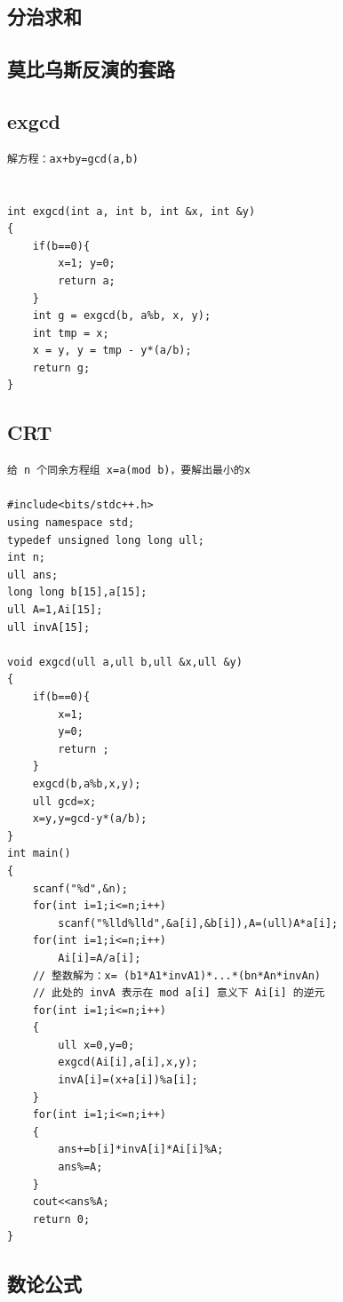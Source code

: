 \documentclass[11pt,a4paper]{ctexart}
\begin{document}
\subsection{分治求和}



\subsection{莫比乌斯反演的套路}



\subsection{exgcd}

\begin{lstlisting}
解方程：ax+by=gcd(a,b)


int exgcd(int a, int b, int &x, int &y)
{
    if(b==0){
        x=1; y=0;
        return a;
    }
    int g = exgcd(b, a%b, x, y); 
    int tmp = x;
    x = y, y = tmp - y*(a/b);
    return g;
}
\end{lstlisting}

\subsection{CRT}

\begin{lstlisting}
给 n 个同余方程组 x=a(mod b)，要解出最小的x

#include<bits/stdc++.h>
using namespace std;
typedef unsigned long long ull;
int n;
ull ans;
long long b[15],a[15];
ull A=1,Ai[15];
ull invA[15];

void exgcd(ull a,ull b,ull &x,ull &y)
{
	if(b==0){
		x=1;
		y=0;
		return ;
	}
	exgcd(b,a%b,x,y);
	ull gcd=x;
	x=y,y=gcd-y*(a/b);
}
int main()
{
	scanf("%d",&n);
	for(int i=1;i<=n;i++)
		scanf("%lld%lld",&a[i],&b[i]),A=(ull)A*a[i];
	for(int i=1;i<=n;i++)
		Ai[i]=A/a[i];
	// 整数解为：x= (b1*A1*invA1)*...*(bn*An*invAn) 
	// 此处的 invA 表示在 mod a[i] 意义下 Ai[i] 的逆元
	for(int i=1;i<=n;i++)
	{
		ull x=0,y=0;
		exgcd(Ai[i],a[i],x,y);
		invA[i]=(x+a[i])%a[i];
	}
	for(int i=1;i<=n;i++)
	{
		ans+=b[i]*invA[i]*Ai[i]%A;
		ans%=A;
	}
	cout<<ans%A;
	return 0;
}
\end{lstlisting}

\subsection{数论公式}
\end{document}
